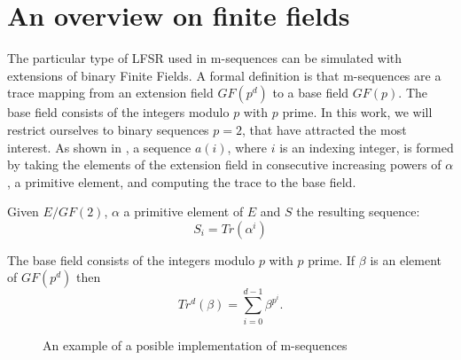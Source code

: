 \appendix
\section{An overview on finite fields}
The particular type of LFSR used in m-sequences can be simulated with extensions of binary
Finite Fields.  A formal definition is that m-sequences are a trace mapping from an extension field $GF(p^d)$ to a base field $GF(p)$. The base field consists of the integers modulo $p$ with $p$ prime. In this work, we will restrict ourselves to binary sequences $p=2$, that have attracted the most interest.  As shown in \citet{golomb_ref}, a sequence $a(i)$, where $i$ is an indexing integer, is formed by taking the elements of the extension field in consecutive increasing powers of $\alpha$, a primitive element, and computing  the trace to the base field.

\begin{definition}
  Given $E/GF(2)$, $\alpha$ a primitive element of $E$ and $S$ the resulting
  sequence:
  \begin{equation}
    S_{i} = Tr(\alpha^{i})
  \end{equation}
\end{definition}
 The base field consists of the integers modulo $p$ with $p$ prime. If $\beta$ is an element of $GF(p^d)$ then
\begin{equation}
 Tr^d(\beta)=\sum_{i=0}^{d-1} \beta^{p^i}.
\end{equation}

\begin{figure}[ht!]
  \caption{An example of a posible implementation of m-sequences}
  \label{mls:fig:1}
\end{figure}
 

